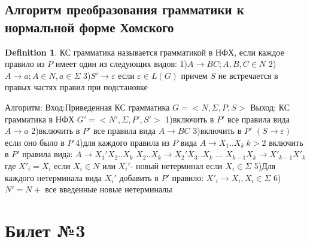 \documentclass[a4paper]{article}
\theoremstyle{plain}
\theoremstyle{remark}
\theoremstyle{definition}
\newtheorem*{definition-star}{Definition}
\begin{document}
\subsection{Алгоритм преобразования грамматики к нормальной форме Хомского}
\begin{definition-star}КС грамматика называется грамматикой в НФХ, если  каждое правило из $P$  имеет один из следующих видов:
1)$A\rightarrow BC; A,B,C\in N$
2)$A\rightarrow a; A\in N, a\in \Sigma$
3)$S'\rightarrow \varepsilon$ если  $\varepsilon \in L(G)$ причем $S$  не встречается  в правых частях правил при подстановке
\end{definition-star}
Алгоритм:
Вход:Приведенная КС грамматика $G=<N,\Sigma,P,S>$
Выход: КС грамматика в НФХ $G'=<N',\Sigma,P',S'>$
1)включить в $P'$ все правила вида $A\rightarrow a$
2)включить в $P'$ все правила вида $A\rightarrow BC$
3)включить в $P'$ $(S\rightarrow \varepsilon)$ если оно было в $P$
4)для каждого правила из $P$ вида
$A\rightarrow X_1..X_k\  k>2$ включить в $P'$ правила вида:
$A\rightarrow X_1'X_2..X_k$
$X_2..X_k\rightarrow X_2'X_3..X_k$
...
$X_{k-1}X_k\rightarrow X'_{k-1}X'_k$ где $X'_i=X_i$  если  $X_i \in N$ или  $X_i'$- новый нетерминал если $X_i \in \Sigma$
5)Для каждого нетерминала  вида $X_i'$ добавить в $P'$  правило:
$X'_i\rightarrow X_i ,X_i \in \Sigma$
6)$N'=N+$ все введенные новые нетерминалы
\section{Билет №3}
\end{document}
